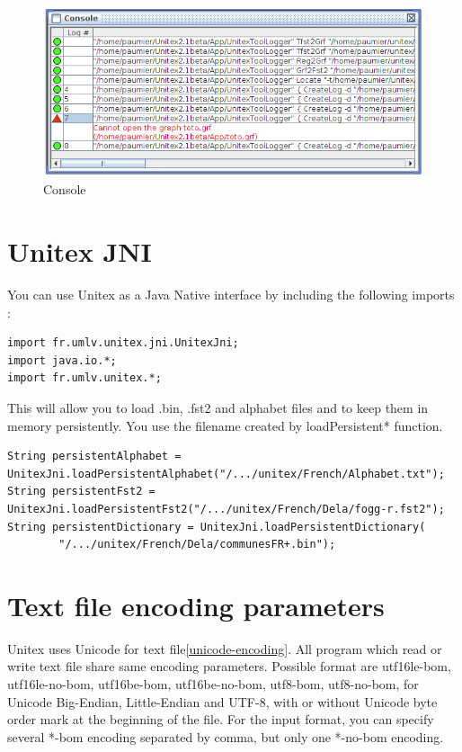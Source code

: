 \bigskip
\begin{figure}[!h]
\begin{center}
\includegraphics[width=15cm]{resources/img/fig11-2.png}
\caption{Console\label{fig-console}}
\end{center}
\end{figure}

\section{Unitex JNI}
\label{section-unitex-JNI}

You can use Unitex as a Java Native interface by including the following imports : 
\begin{verbatim}
import fr.umlv.unitex.jni.UnitexJni;
import java.io.*;
import fr.umlv.unitex.*;
\end{verbatim}
This will allow you to load .bin, .fst2 and alphabet files and to keep them in memory persistently. You use the filename created by loadPersistent* function.

\begin{verbatim}
String persistentAlphabet = UnitexJni.loadPersistentAlphabet("/.../unitex/French/Alphabet.txt");
String persistentFst2 = UnitexJni.loadPersistentFst2("/.../unitex/French/Dela/fogg-r.fst2");
String persistentDictionary = UnitexJni.loadPersistentDictionary(
		"/.../unitex/French/Dela/communesFR+.bin");
\end{verbatim}



\section{Text file encoding parameters}
\label{section-text-file-encoding-parameters}
Unitex uses Unicode for text file\ref{unicode-encoding}. All program which read or write
text file share same encoding parameters. Possible format are 
utf16le-bom, utf16le-no-bom, utf16be-bom, utf16be-no-bom, utf8-bom, utf8-no-bom, 
for Unicode Big-Endian, Little-Endian and UTF-8, with or without Unicode byte order mark at the beginning of the file.
For the input format, you can specify several *-bom encoding separated by comma, but only one *-no-bom encoding.

